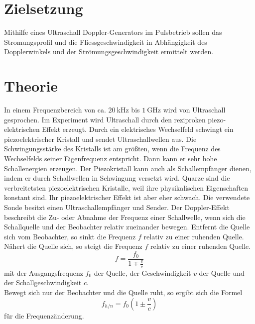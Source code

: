 \section{Zielsetzung}
\label{sec:Zielsetzung}

Mithilfe eines Ultraschall Doppler-Generators im Pulsbetrieb sollen das Stromungsprofil und die Fliessgeschwindigkeit
in Abhängigkeit des Dopplerwinkels und der Strömungsgeschwindigkeit ermittelt werden.

\section{Theorie}
\label{sec:Theorie}

In einem Frequenzbereich von ca. $\SI{20}{\kilo\Hz}$ bis $\SI{1}{\giga\Hz}$ wird von Ultraschall gesprochen.
Im Experiment wird Ultraschall durch den reziproken piezo-elektrischen Effekt erzeugt. 
Durch ein elektrisches Wechselfeld schwingt ein piezoelektrischer Kristall und sendet Ultraschallwellen aus.
Die Schwingungsstärke des Kristalls ist am größten, wenn die Frequenz des Wechselfelds seiner Eigenfrequenz entspricht. 
Dann kann er sehr hohe Schallenergien erzeugen. Der Piezokristall kann auch als Schallempfänger dienen, 
indem er durch Schallwellen in Schwingung versetzt wird. Quarze sind die verbreitetsten piezoelektrischen Kristalle, 
weil ihre physikalischen Eigenschaften konstant sind. Ihr piezoelektrischer Effekt ist aber eher schwach.
Die verwendete Sonde besitzt einen Ultraschallempfänger und Sender.
Der Doppler-Effekt beschreibt die Zu- oder Abnahme der Frequenz einer Schallwelle, wenn sich die Schallquelle und 
der Beobachter relativ zueinander bewegen. 
Entfernt die Quelle sich vom Beobachter, so sinkt die Frequenz $f$ relativ zu einer ruhenden Quelle.
Nähert die Quelle sich, so steigt die Frequenz $f$ relativ zu einer ruhenden Quelle.
\begin{equation}\label{eq:Doppler1}
    f = \frac{f_0}{1 \mp \frac{v}{c}}%
\end{equation}
mit der Ausgangsfrequenz $f_0$ der Quelle, der Geschwindigkeit $v$ der Quelle und der Schallgeschwindigkeit $c$.\\
Bewegt sich nur der Beobachter und die Quelle ruht, so ergibt sich die Formel
\begin{equation}\label{eq:Doppler2}
    f_{h/n} = f_0 \left(1 \pm \frac{v}{c}\right)
\end{equation}
für die Frequenzänderung.\\

